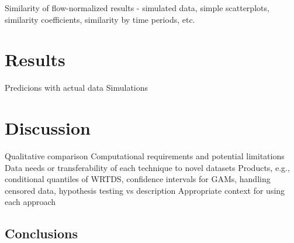 \documentclass[letterpaper,12pt,oneside]{article}\usepackage[]{graphicx}\usepackage[]{color}
\begin{document}
Similarity of flow-normalized results - simulated data, simple scatterplots, similarity coefficients, similarity by time periods, etc.

\section{Results}

\begin{outline}
\0 Predicions with actual data
\0 Simulations
\end{outline}

\section{Discussion}

\begin{outline}
\0 Qualitative comparison
\1 Computational requirements and potential limitations
\1 Data needs or transferability of each technique to novel datasets
\1 Products, e.g., conditional quantiles of \ac{WRTDS}, confidence intervals for \acp{GAM}, handling censored data, hypothesis testing vs description
\1 Appropriate context for using each approach
\end{outline}

\subsection{Conclusions}

\clearpage
\begin{singlespace}


\end{singlespace}
\clearpage


\end{document}
